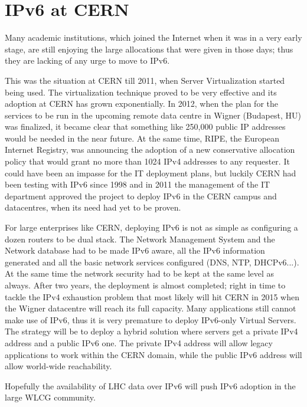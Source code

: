 \section{IPv6 at CERN}
Many academic institutions, which joined the Internet when it was in a very early stage, are still enjoying the large allocations that were given in those days; thus they are lacking of any urge to move to IPv6.
\par 
This was the situation at CERN till 2011, when Server Virtualization started being used. The virtualization technique proved to be very effective and its adoption at CERN has grown exponentially. In 2012, when the plan for the services to be run in the upcoming remote data centre in Wigner (Budapest, HU) was finalized, it became clear that something like 250,000 public IP addresses would be needed in the near future. At the same time, RIPE, the European Internet Registry, was announcing the adoption of a new conservative allocation policy that would grant no more than 1024 IPv4 addresses to any requester. 
It could have been an impasse for the IT deployment plans, but luckily CERN had been testing with IPv6 since 1998 and in 2011 the management of the IT department approved the project to deploy IPv6 in the CERN campus and datacentres, when its need had yet to be proven.
\par
For large enterprises like CERN, deploying IPv6 is not as simple as configuring a dozen routers to be dual stack. The Network Management System and the Network database had to be made IPv6 aware, all the IPv6 information generated and all the basic network services configured (DNS, NTP, DHCPv6...). At the same time the network security had to be kept at the same level as always.
After two years, the deployment is almost completed; right in time to tackle the IPv4 exhaustion problem that most likely will hit CERN in 2015 when the Wigner datacentre will reach its full capacity. 
Many applications still cannot make use of IPv6, thus it is very premature to deploy IPv6-only Virtual Servers. The strategy will be to deploy a hybrid solution where servers get a private IPv4 address and a public IPv6 one. The private IPv4 address will allow legacy applications to work within the CERN domain,  while the public IPv6 address will allow world-wide reachability.
\par
Hopefully the availability of LHC data over IPv6 will push IPv6 adoption in the large WLCG community.

